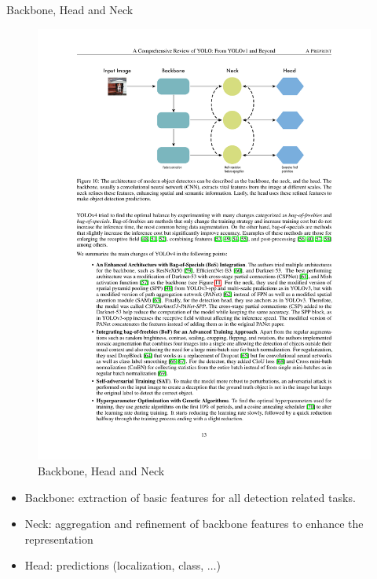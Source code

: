 \documentclass[xcolor=pdftex,dvipsnames,table]{beamer}
\begin{document}
\begin{frame}{Backbone, Head and Neck}
\begin{figure}[htb]
   \centering
   \includegraphics[width=.7\textwidth]{../graphics/Backbone_Head_Neck.pdf}
   \caption{Backbone, Head and Neck}
\end{figure}
\begin{itemize}
   \item Backbone: extraction of basic features for all detection related tasks.
   \item Neck: aggregation and refinement of backbone features to enhance the representation
   \item Head: predictions (localization, class, $\ldots$)
\end{itemize}
\end{frame}
\end{document}
